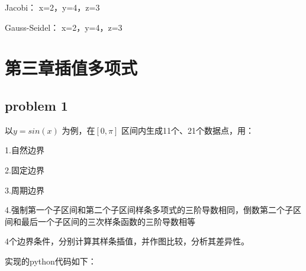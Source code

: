 \documentclass[UTF8]{ctexart}
\begin{document}
Jacobi：
x=2，y=4，z=3

Gauss-Seidel：
x=2，y=4，z=3
\newpage
\section{第三章插值多项式}
\subsection{problem 1}
以$ y=sin(x)$ 为例，在$[0, \pi ] $ 区间内生成11个、21个数据点，用：

1.自然边界

2.固定边界

3.周期边界

4.强制第一个子区间和第二个子区间样条多项式的三阶导数相同，倒数第二个子区间和最后一个子区间的三次样条函数的三阶导数相等

4个边界条件，分别计算其样条插值，并作图比较，分析其差异性。

实现的python代码如下：
\end{document}
